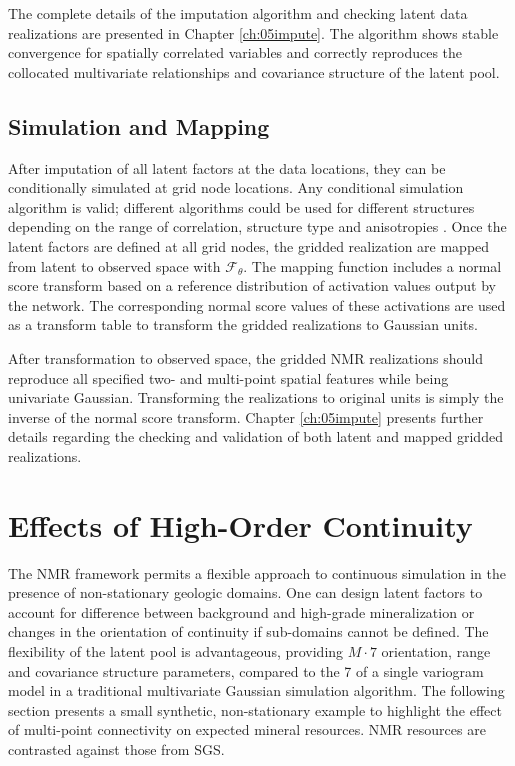 The complete details of the imputation algorithm and checking latent data realizations are presented in Chapter \ref{ch:05impute}. The algorithm shows stable convergence for spatially correlated variables and correctly reproduces the collocated multivariate relationships and covariance structure of the latent pool.

\FloatBarrier
\subsection{Simulation and Mapping}
\label{subsec:03simulate}

After imputation of all latent factors at the data locations, they can be conditionally simulated at grid node locations. Any conditional simulation algorithm is valid; different algorithms could be used for different structures depending on the range of correlation, structure type and anisotropies \citep{pinto2020independent}. Once the latent factors are defined at all grid nodes, the gridded realization are mapped from latent to observed space with $\mathcal{F}_{\theta}$. The mapping function includes a normal score transform based on a reference distribution of activation values output by the network. The corresponding normal score values of these activations are used as a transform table to transform the gridded realizations to Gaussian units.

After transformation to observed space, the gridded \gls{NMR} realizations should reproduce all specified two- and multi-point spatial features while being univariate Gaussian. Transforming the realizations to original units is simply the inverse of the normal score transform. Chapter \ref{ch:05impute} presents further details regarding the checking and validation of both latent and mapped gridded realizations.


\FloatBarrier
\section{Effects of High-Order Continuity}
\label{sec:03effect}

The \gls{NMR} framework permits a flexible approach to continuous simulation in the presence of non-stationary geologic domains. One can design latent factors to account for difference between background and high-grade mineralization or changes in the orientation of continuity if sub-domains cannot be defined. The flexibility of the latent pool is advantageous, providing $M \cdot 7$ orientation, range and covariance structure parameters, compared to the 7 of a single variogram model in a traditional multivariate Gaussian simulation algorithm. The following section presents a small synthetic, non-stationary example to highlight the effect of multi-point connectivity on expected mineral resources. \Gls{NMR} resources are contrasted against those from \gls{SGS}.


